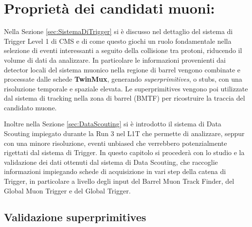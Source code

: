 \chapter{Proprietà dei candidati muoni:}
\label{cap:SecondoCapitolo}

Nella Sezione \ref{sec:SistemaDiTrigger} si è discusso nel dettaglio del sistema di Trigger Level 1 di CMS e di come questo giochi un ruolo fondamentale nella selezione di eventi interessanti a seguito della collisione tra protoni, riducendo il volume di dati da analizzare. In particolare le informazioni provenienti dai detector locali del sistema muonico nella regione di barrel vengono combinate e processate dalle schede \textbf{TwinMux}, generando \textit{superprimitives}, o stubs, con una risoluzione temporale e spaziale elevata. Le superprimitives vengono poi utilizzate dal sistema di tracking nella zona di barrel (BMTF) per ricostruire la traccia del candidato muone.

Inoltre nella Sezione \ref{sec:DataScouting} si è introdotto il sistema di Data Scouting impiegato durante la Run 3 nel L1T che permette di analizzare, seppur con una minore risoluzione, eventi unbiased che verrebbero potenzialmente rigettati dal sistema di Trigger. In questo capitolo si procederà con lo studio e la validazione dei dati ottenuti dal sistema di Data Scouting, che raccoglie informazioni impiegando schede di acquisizione in vari step della catena di Trigger, in particolare a livello degli input del Barrel Muon Track Finder, del Global Muon Trigger e del Global Trigger.


\section{Validazione superprimitives}

